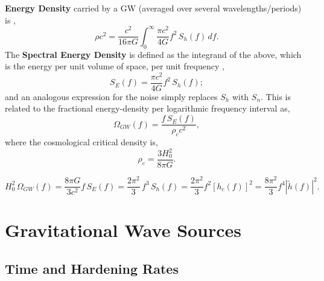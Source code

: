 \documentclass[10pt, oneside, onecolumn]{article}   	%
\begin{document}
            \textbf{Energy Density} carried by a GW (averaged over several wavelengths/periods) is \citep{moore2015},
            \begin{equation}
                \rho c^2 = \frac{c^2}{16\pi G} \int_0^\infty \frac{\pi c^2}{4G} f^2 \, S_h(f) \, df.
            \end{equation}
            The \textbf{Spectral Energy Density} is defined as the integrand of the above, which is the energy per unit volume of space, per unit frequency \citep{moore2015},
            \begin{equation}
                S_E(f) = \frac{\pi c^2}{4 G} f^2 \, S_h(f);
            \end{equation}
            and an analogous expression for the noise simply replaces $S_h$ with $S_n$.  This is related to the fractional energy-density per logarithmic frequency interval as,
            \begin{equation}
                \Omega_{GW}(f) = \frac{f \, S_E(f)}{\rho_c c^2},
            \end{equation}
            where the cosmological critical density is,
            \begin{equation}
                \rho_c = \frac{3 H_0^2}{8\pi G}.
            \end{equation}

            \begin{equation*}
                H_0^2 \, \Omega_{GW}(f) = \frac{8\pi G}{3 c^2} f \, S_E(f) = \frac{2 \pi^2}{3} \, f^3 \, S_h(f) = \frac{2\pi^2}{3} f^2 \left[h_c(f) \right]^2 = \frac{8\pi^2}{3} f^4 \left| \tilde{h}(f)\right|^2.
            \end{equation*}




    \section{Gravitational Wave Sources}

        \subsection{Time and Hardening Rates}
\end{document}

